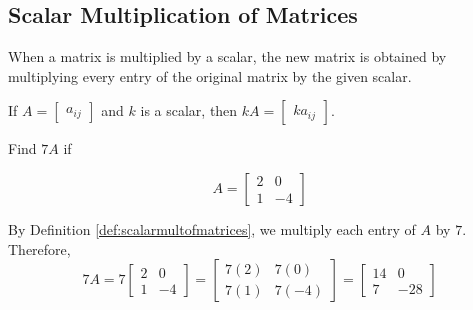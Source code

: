 \documentclass{ximera}
\begin{document}
\subsection*{Scalar Multiplication of Matrices}

When a matrix is multiplied by a scalar, the new matrix is obtained by multiplying every entry of the original matrix
by the given scalar. 

\begin{definition}\label{def:scalarmultofmatrices}
If $A=\begin{bmatrix} a_{ij}\end{bmatrix} $ and $k$ is a scalar,
then $kA=\begin{bmatrix} ka_{ij}\end{bmatrix}$. 
\end{definition}

\begin{example}\label{ex:effectofscalarmult}
Find $7A$ if

$$A=\begin{bmatrix}
2 & 0 \\
1 & -4
\end{bmatrix}$$



\begin{explanation}
By Definition \ref{def:scalarmultofmatrices}, we multiply each entry of $A$ by $7$.
Therefore,
$$7A = 
7\begin{bmatrix}
2 & 0 \\
1 & -4
\end{bmatrix} =
\begin{bmatrix}
7(2) & 7(0) \\
7(1) & 7(-4)
\end{bmatrix} =
\begin{bmatrix}
14 & 0 \\
7 & -28
\end{bmatrix}$$
\end{explanation}
\end{example}
\end{document}
